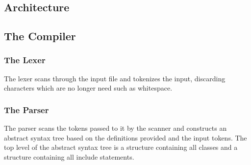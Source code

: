 \begin{homeworkProblem}
	\chapter{Architecture}
	\section{The Compiler}
	\subsection{The Lexer}
    The lexer scans through the input file and tokenizes the input, discarding characters which are no longer need such as whitespace.
	
	\subsection{The Parser}
    The parser scans the tokens passed to it by the scanner and constructs an abstract syntax tree based on the definitions provided and the input tokens. The top level of the abstract syntax tree is a structure containing all classes and a structure containing all include statements. 

\end{homeworkProblem}
